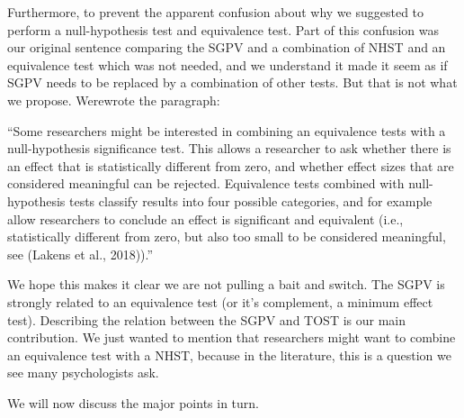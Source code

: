 \documentclass[man]{apa6}
\begin{document}
Furthermore, to prevent the apparent confusion about why we suggested to
perform a null-hypothesis test and equivalence test. Part of this
confusion was our original sentence comparing the SGPV and a combination
of NHST and an equivalence test which was not needed, and we understand
it made it seem as if SGPV needs to be replaced by a combination of
other tests. But that is not what we propose. Werewrote the paragraph:

\enquote{Some researchers might be interested in combining an
equivalence tests with a null-hypothesis significance test. This allows
a researcher to ask whether there is an effect that is statistically
different from zero, and whether effect sizes that are considered
meaningful can be rejected. Equivalence tests combined with
null-hypothesis tests classify results into four possible categories,
and for example allow researchers to conclude an effect is significant
and equivalent (i.e., statistically different from zero, but also too
small to be considered meaningful, see (Lakens et al., 2018)).}

We hope this makes it clear we are not pulling a bait and switch. The
SGPV is strongly related to an equivalence test (or it's complement, a
minimum effect test). Describing the relation between the SGPV and TOST
is our main contribution. We just wanted to mention that researchers
might want to combine an equivalence test with a NHST, because in the
literature, this is a question we see many psychologists ask.

We will now discuss the major points in turn.
\end{document}

